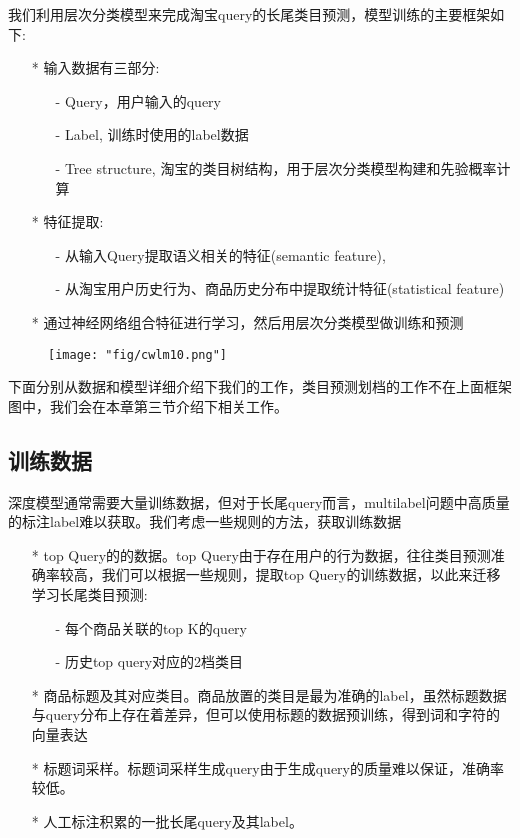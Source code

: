 我们利用层次分类模型来完成淘宝query的长尾类目预测，模型训练的主要框架如下:
\begin{itemize}
\item[*] 输入数据有三部分:
\begin{itemize}
\item[-] Query，用户输入的query
\item[-] Label, 训练时使用的label数据
\item[-] Tree structure, 淘宝的类目树结构，用于层次分类模型构建和先验概率计算
\end{itemize}
\item[*]  特征提取:
\begin{itemize}
\item[-] 从输入Query提取语义相关的特征(semantic feature),
\item[-]从淘宝用户历史行为、商品历史分布中提取统计特征(statistical feature)
\end{itemize}
\item[*]  通过神经网络组合特征进行学习，然后用层次分类模型做训练和预测
\end{itemize}

\begin{figure}[!h]
	\centering
	\texttt{[image: "fig/cwlm10.png"]}
	\caption{}
	\label{fig:cwlm10}
\end{figure}

下面分别从数据和模型详细介绍下我们的工作，类目预测划档的工作不在上面框架图中，我们会在本章第三节介绍下相关工作。

\subsection{训练数据}
深度模型通常需要大量训练数据，但对于长尾query而言，multilabel问题中高质量的标注label难以获取。我们考虑一些规则的方法，获取训练数据
\begin{itemize}
\item[*] top Query的的数据。top Query由于存在用户的行为数据，往往类目预测准确率较高，我们可以根据一些规则，提取top Query的训练数据，以此来迁移学习长尾类目预测:
\begin{itemize}
\item[-] 每个商品关联的top K的query
\item[-] 历史top query对应的2档类目
\end{itemize}
\item[*] 商品标题及其对应类目。商品放置的类目是最为准确的label，虽然标题数据与query分布上存在着差异，但可以使用标题的数据预训练，得到词和字符的向量表达
\item[*] 标题词采样。标题词采样生成query由于生成query的质量难以保证，准确率较低。
\item[*] 人工标注积累的一批长尾query及其label。
\end{itemize}

